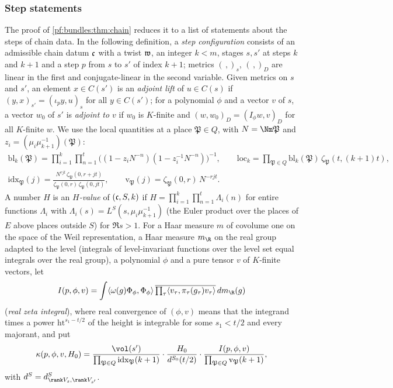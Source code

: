 \subsubsection{Step statements}

The proof of \cref{pf:bundles:thm:chain} reduces it to a list of statements about the steps of chain data. In the following
definition, a \emph{step configuration} consists of an admissible chain datum $\mathfrak c$ with a twist $\mathfrak w$, an integer $k<m$, stages
$s,s'$ at steps $k$ and $k+1$ and a step $p$ from $s$ to $s'$ of index $k+1$; metrics $(\,,)_s$, $(\,,)_D$ are linear in the first and
conjugate-linear in the second variable. Given metrics on $s$ and $s'$, an element $x\in C(s')$ is an \emph{adjoint lift} of $u\in C(s)$ if
$(y,x)_{s'}=(\iota_p y,u)_s$ for all $y\in C(s')$; for a polynomial $\phi$ and a vector $v$ of $s$, a vector $w_0$ of $s'$ is \emph{adjoint
to $v$} if $w_0$ is $K$-finite and $(w,w_0)_D=(I_\phi w,v)_D$ for all $K$-finite $w$. We use the local quantities at a place
$\mathfrak P\in Q$, with $N=\Nm\mathfrak P$ and $z_i=(\mu_i\mu_{k+1}^{-1})(\mathfrak P)$:
\begin{gather*}
\mathrm{bl}_k(\mathfrak P)=\prod_{i=1}^k\prod_{n=1}^t\bigl((1-z_iN^{-n})(1-z_i^{-1}N^{-n})\bigr)^{-1},\qquad
\mathrm{loc}_k=\prod_{\mathfrak P\in Q}\mathrm{bl}_k(\mathfrak P)\,\zeta_{\mathfrak P}(t,(k+1)t),\\
\mathrm{idx}_{\mathfrak P}(j)=\frac{N^{rjt}\,\zeta_{\mathfrak P}(0,r+jt)}{\zeta_{\mathfrak P}(0,r)\,\zeta_{\mathfrak P}(0,jt)},\qquad
\mathrm{v}_{\mathfrak P}(j)=\zeta_{\mathfrak P}(0,r)\,N^{-rjt}.
\end{gather*}
A number $H$ is an \emph{$H$-value} of $(\mathfrak c,S,k)$ if $H=\prod_{i=1}^k\prod_{n=1}^t\Lambda_i(n)$ for entire functions $\Lambda_i$ with
$\Lambda_i(s)=L^S(s,\mu_i\mu_{k+1}^{-1})$ (the Euler product over the places of $E$ above places outside $S$) for $\Re s>1$. For a
Haar measure $m$ of covolume one on the space of the Weil representation, a Haar measure $m_\R$ on the real group adapted to the level
(integrals of level-invariant functions over the level set equal integrals over the real group), a polynomial $\phi$ and a pure tensor $v$
of $K$-finite vectors, let
\[
I(p,\phi,v)=\int\langle\omega(g)\Phi_\phi,\Phi_\phi\rangle\,\overline{\textstyle\prod_\tau\langle v_\tau,\pi_\tau(g_\tau)v_\tau\rangle}\,dm_\R(g)
\]
(\emph{real zeta integral}), where real convergence of $(\phi,v)$ means that the integrand times a power $\mathrm{ht}^{s_1-t/2}$ of the
height is integrable for some $s_1<t/2$ and every majorant, and put
\[
\kappa(p,\phi,v,H_0)=\frac{\vol(s')}{\prod_{\mathfrak P\in Q}\mathrm{idx}_{\mathfrak P}(k+1)}\cdot\frac{H_0}{d^{S_0}(t/2)}\cdot
\frac{I(p,\phi,v)}{\prod_{\mathfrak P\in Q}\mathrm v_{\mathfrak P}(k+1)},
\]
with $d^{S}=d^S_{\rank V_s,\rank V_{s'}}$.

